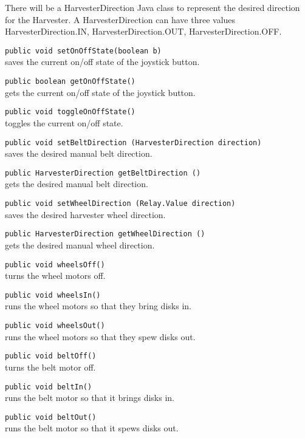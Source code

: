 \documentclass[]{article}
\begin{document}
There will be a HarvesterDirection Java class to represent the desired direction for the Harvester. A HarvesterDirection can have three values HarvesterDirection.IN, HarvesterDirection.OUT, HarvesterDirection.OFF.

\noindent
\lstinline[]|public void setOnOffState(boolean b)| \\
saves the current on/off state of the joystick button.

\noindent
\lstinline[]|public boolean getOnOffState()| \\
gets the current on/off state of the joystick button.

\noindent
\lstinline[]|public void toggleOnOffState()| \\
toggles the current on/off state.

\noindent
\lstinline[]|public void setBeltDirection (HarvesterDirection direction)| \\
saves the desired manual belt direction.

\noindent
\lstinline[]|public HarvesterDirection getBeltDirection ()| \\
gets the desired manual belt direction.

\noindent
\lstinline[]|public void setWheelDirection (Relay.Value direction)| \\
saves the desired harvester wheel direction.

\noindent
\lstinline[]|public HarvesterDirection getWheelDirection ()| \\
gets the desired manual wheel direction.

\noindent
\lstinline[]|public void wheelsOff()| \\
turns the wheel motors off.

\noindent
\lstinline[]|public void wheelsIn()| \\
runs the wheel motors so that they bring disks in.

\noindent
\lstinline[]|public void wheelsOut()| \\
runs the wheel motors so that they spew disks out.

\noindent
\lstinline[]|public void beltOff()| \\
turns the belt motor off.

\noindent
\lstinline[]|public void beltIn()| \\
runs the belt motor so that it brings disks in.

\noindent
\lstinline[]|public void beltOut()| \\
runs the belt motor so that it spews disks out.
\end{document}
